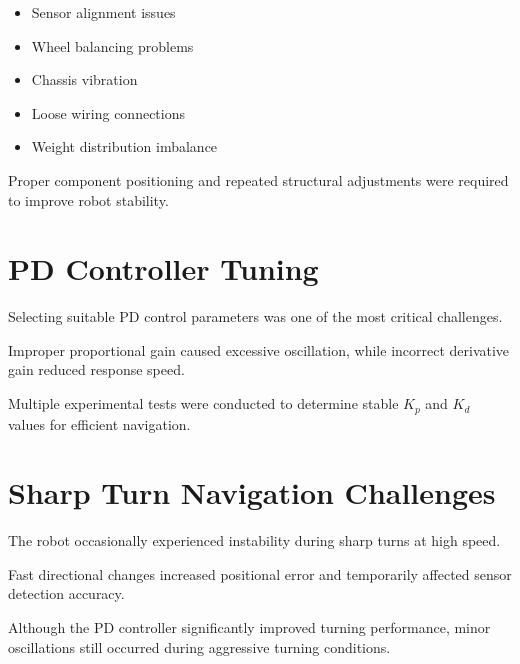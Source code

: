 \documentclass[12pt,a4paper,oneside]{report}
\begin{document}
\begin{itemize}

\item Sensor alignment issues

\item Wheel balancing problems

\item Chassis vibration

\item Loose wiring connections

\item Weight distribution imbalance

\end{itemize}

Proper component positioning and repeated structural adjustments were required to improve robot stability.


\section{PD Controller Tuning}

Selecting suitable PD control parameters was one of the most critical challenges.

Improper proportional gain caused excessive oscillation, while incorrect derivative gain reduced response speed.

Multiple experimental tests were conducted to determine stable \(K_p\) and \(K_d\) values for efficient navigation.


\section{Sharp Turn Navigation Challenges}

The robot occasionally experienced instability during sharp turns at high speed.

Fast directional changes increased positional error and temporarily affected sensor detection accuracy.

Although the PD controller significantly improved turning performance, minor oscillations still occurred during aggressive turning conditions.
\end{document}
